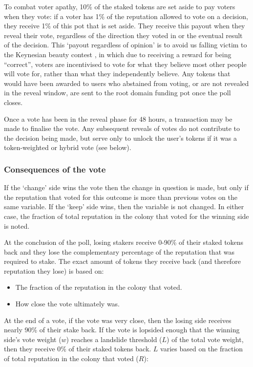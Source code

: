 To combat voter apathy, 10\% of the staked tokens are set aside to pay voters when they vote: if a voter has 1\% of the reputation allowed to vote on a decision, they receive 1\% of this pot that is set aside. They receive this payout when they reveal their vote, regardless of the direction they voted in or the eventual result of the decision. This `payout regardless of opinion' is to avoid us falling victim to the Keynesian beauty contest \cite{KeynesianBeauty}, in which due to receiving a reward for being “correct”, voters are incentivised to vote for what they believe most other people will vote for, rather than what they independently believe. Any tokens that would have been awarded to users who abstained from voting, or are not revealed in the reveal window, are sent to the root domain funding pot once the poll closes.

Once a vote has been in the reveal phase for 48 hours, a transaction may be made to finalise the vote. Any subsequent reveals of votes do not contribute to the decision being made, but serve only to unlock the user's tokens if it was a token-weighted or hybrid vote (see below).

\subsubsection*{Consequences of the vote}

If the `change' side wins the vote then the change in question is made, but only if the reputation that voted for this outcome is more than previous votes on the same variable. If the `keep' side wins, then the variable is not changed. In either case, the fraction of total reputation in the colony that voted for the winning side is noted.

At the conclusion of the poll, losing stakers receive 0-90\% of their staked tokens back and they lose the  complementary percentage of the reputation that was required to stake. The exact amount of tokens they receive back (and therefore reputation they lose) is based on:

\begin{itemize}
 \item The fraction of the reputation in the colony that voted.
 \item How close the vote ultimately was.
\end{itemize}

At the end of a vote, if the vote was very close, then the losing side receives nearly 90\% of their stake back. If the vote is lopsided enough that the winning side's vote weight ($w$) reaches a landslide threshold ($L$) of the total vote weight, then they receive 0\% of their staked tokens back. $L$ varies based on the fraction of total reputation in the colony that voted ($R$):

